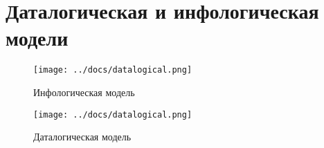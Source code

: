 \section{Даталогическая и инфологическая модели}

\begin{figure}[h!]
	\centering
	\texttt{[image: ../docs/datalogical.png]}
	\caption{Инфологическая модель}
\end{figure}

\begin{figure}[h!]
	\centering
	\texttt{[image: ../docs/datalogical.png]}
	\caption{Даталогическая модель}
\end{figure}
\clearpage


